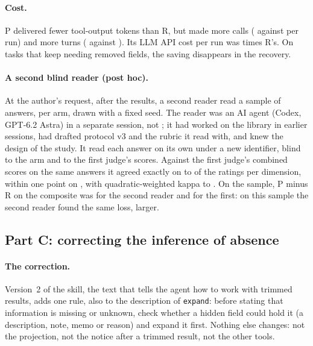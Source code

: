 \paragraph{Cost.} P delivered \SfourBTokens{} fewer tool-output tokens than R, but made more calls
(\SfourBCallsP{} against \SfourBCallsR{} per run) and more turns (\SfourBTurnsP{} against \SfourBTurnsR{}). Its LLM
API cost per run was \SfourBCost{} times R's. On tasks that keep needing removed fields, the saving disappears in
the recovery.

\paragraph{A second blind reader (post hoc).} At the author's request, after the results, a second reader read
a sample of \SfourBSecondAnswers{} answers, \SfourBSecondPerArm{} per arm, drawn with a fixed seed. The reader was
an AI agent (Codex, GPT-6.2 Astra) in a separate session, not \texttt{\SfourJudge}; it had worked on the library in earlier sessions, had
drafted protocol v3 and the rubric it read with, and knew the design of the study. It read each answer on its own under a new identifier, blind to the arm and to the
first judge's scores. Against the first judge's combined scores on the
same answers it agreed exactly on \SfourBSecondExactMin{} to \SfourBSecondExactMax{} of the ratings per
dimension, within one point on \SfourBSecondWithinOne{}, with quadratic-weighted kappa \SfourBSecondKappaMin{} to
\SfourBSecondKappaMax{}. On the sample, P minus R on the composite was \SfourBSecondReaderDiff{} for the second
reader and \SfourBSecondJudgeDiff{} for the first: on this sample the second reader found the same loss, larger.

\subsection{Part C: correcting the inference of absence}
\label{sec:s4c}

\paragraph{The correction.} Version~2 of the skill, the text that tells the agent how to work with trimmed
results, adds one rule, also to the description of \texttt{expand}: before stating that information is missing
or unknown, check whether a hidden field could hold it (a description, note, memo or reason) and expand it first.
Nothing else changes: not the projection, not the notice after a trimmed result, not the other tools.

